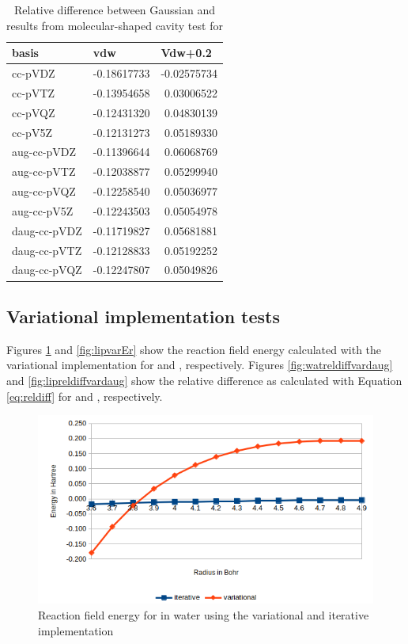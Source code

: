 \documentclass[../Thesis.tex]{subfiles}
\begin{document}
\begin{table}[htbp]
\caption[Relative difference between Gaussian and \mrchem results for ]{Relative difference between Gaussian and \mrchem results from molecular-shaped cavity  test for }
\begin{tabular}{l|r|r}
basis & \multicolumn{1}{l|}{vdw} & \multicolumn{1}{l|}{Vdw+0.2} \\ \hline
cc-pVDZ & -0.18617733 & -0.02575734 \\
cc-pVTZ & -0.13954658 & 0.03006522 \\
cc-pVQZ & -0.12431320 & 0.04830139 \\
cc-pV5Z & -0.12131273 & 0.05189330 \\ \hline
aug-cc-pVDZ & -0.11396644 & 0.06068769 \\
aug-cc-pVTZ & -0.12038877 & 0.05299940 \\
aug-cc-pVQZ & -0.12258540 & 0.05036977 \\
aug-cc-pV5Z & -0.12243503 & 0.05054978 \\ \hline
daug-cc-pVDZ & -0.11719827 & 0.05681881 \\
daug-cc-pVTZ & -0.12128833 & 0.05192252 \\
daug-cc-pVQZ & -0.12247807 & 0.05049826 \\
\end{tabular}
\label{tab:acetamidabcreldiff}
\end{table}
\clearpage


\subsection{Variational implementation tests}
Figures \ref{fig:watvarEr} and \ref{fig:lipvarEr} show the reaction field energy
calculated with the variational implementation for  and ,
respectively. Figures \ref{fig:watreldiffvardaug} and \ref{fig:lipreldiffvardaug} show the
relative difference as calculated with Equation \ref{eq:reldiff} for  and ,
respectively.

\begin{figure}[!htb]
  \centering
  \includegraphics[width=0.75\linewidth]{img/watvarEr.png}
  \caption{Reaction field energy for  in water using the variational and iterative implementation}
  \label{fig:watvarEr}
\end{figure}
\end{document}
